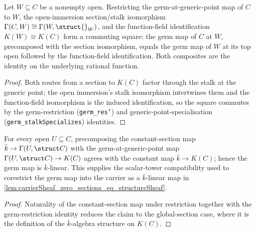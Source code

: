 \begin{lemma}
  \label{lem:germToFunctionField_topIso_square}
  Let \(W \subseteq C\) be a nonempty open. Restricting the germ-at-generic-point
  map of \(C\) to \(W\), the open-immersion section/stalk isomorphism
  \(\Gamma(C, W) \cong \Gamma(W, \struct{}_W)\), and the function-field
  identification \(K(W) \cong K(C)\) form a commuting square: the germ map of
  \(C\) at \(W\), precomposed with the section isomorphism, equals the germ map
  of \(W\) at its top open followed by the function-field identification. Both
  composites are the identity on the underlying rational function.
\end{lemma}
\begin{proof}

\leanok
  Both routes from a section to \(K(C)\) factor through the stalk at the generic
  point; the open immersion's stalk isomorphism intertwines them and the
  function-field isomorphism is the induced identification, so the square commutes
  by the germ-restriction (\texttt{germ\_res'}) and generic-point-specialisation
  (\texttt{germ\_stalkSpecializes}) identities.
\end{proof}

\begin{lemma}
  \label{lem:germToFunctionField_algebraMap}
  For every open \(U \subseteq C\), precomposing the constant-section map
  \(\bar k \to \Gamma(U, \struct C)\) with the germ-at-generic-point map
  \(\Gamma(U, \struct C) \to K(C)\) agrees with the constant map
  \(\bar k \to K(C)\); hence the germ map is \(\bar k\)-linear. This supplies the
  scalar-tower compatibility used to corestrict the germ map into the carrier as
  a \(\bar k\)-linear map in
  \cref{lem:carrierSheaf_zero_sections_eq_structureSheaf}.
\end{lemma}
\begin{proof}

\leanok
  Naturality of the constant-section map under restriction together with the
  germ-restriction identity reduces the claim to the global-section case, where
  it is the definition of the \(\bar k\)-algebra structure on \(K(C)\).
\end{proof}

